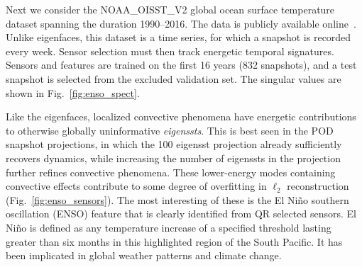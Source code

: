\documentclass[letterpaper]{IEEEtran}
\begin{document}
Next we consider the {NOAA\_OISST\_V2} global ocean surface temperature dataset spanning the duration 1990--2016. The data is publicly available online~\cite{noaa_oisst_v2}.  
Unlike eigenfaces, this dataset is a time series, for which a snapshot is recorded every week. Sensor selection must then track energetic temporal signatures. 
Sensors and features are trained on the first 16 years (832 snapshots), and a test snapshot is selected from the excluded validation set. The singular values are shown in Fig.~\ref{fig:enso_spect}.

Like the eigenfaces, localized convective phenomena have energetic contributions to otherwise globally uninformative {\em eigenssts}. This is best seen in the POD snapshot projections, in which the 100 eigensst projection already sufficiently recovers dynamics, while increasing the number of eigenssts in the projection further refines convective phenomena. These lower-energy modes containing convective effects contribute to some degree of overfitting in $\ell_2$ reconstruction (Fig.~\ref{fig:enso_sensors}). The most interesting of these is the El Ni\~no southern oscillation (ENSO) feature that is clearly identified from QR selected sensors. El Ni\~no is defined as any temperature increase of a specified threshold lasting greater than six months in this highlighted region of the South Pacific. It has been implicated in global weather patterns and climate change. 
\end{document}
